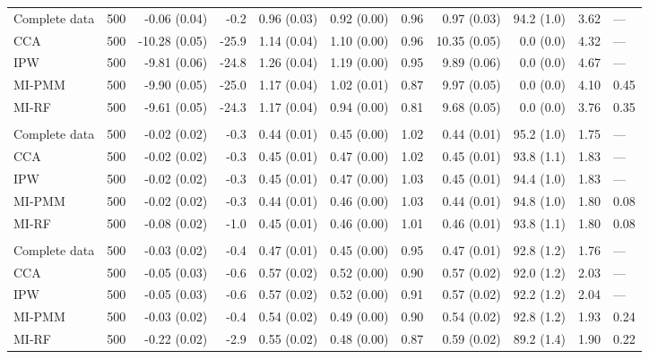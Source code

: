 \begin{longtable}{l|rrrrrrrrrl}
\midrule\addlinespace[2.5pt]
\multicolumn{11}{l}{Stunting — MNAR 50\%} \\[2.5pt] 
\midrule\addlinespace[2.5pt]
Complete data & 500 & -0.06 (0.04) & -0.2 & 0.96 (0.03) & 0.92 (0.00) & 0.96 & 0.97 (0.03) & 94.2 (1.0) & 3.62 & — \\ 
CCA & 500 & -10.28 (0.05) & -25.9 & 1.14 (0.04) & 1.10 (0.00) & 0.96 & 10.35 (0.05) & 0.0 (0.0) & 4.32 & — \\ 
IPW & 500 & -9.81 (0.06) & -24.8 & 1.26 (0.04) & 1.19 (0.00) & 0.95 & 9.89 (0.06) & 0.0 (0.0) & 4.67 & — \\ 
MI-PMM & 500 & -9.90 (0.05) & -25.0 & 1.17 (0.04) & 1.02 (0.01) & 0.87 & 9.97 (0.05) & 0.0 (0.0) & 4.10 & 0.45 \\ 
MI-RF & 500 & -9.61 (0.05) & -24.3 & 1.17 (0.04) & 0.94 (0.00) & 0.81 & 9.68 (0.05) & 0.0 (0.0) & 3.76 & 0.35 \\ 
\midrule\addlinespace[2.5pt]
\multicolumn{11}{l}{Wasting — MCAR 10\%} \\[2.5pt] 
\midrule\addlinespace[2.5pt]
Complete data & 500 & -0.02 (0.02) & -0.3 & 0.44 (0.01) & 0.45 (0.00) & 1.02 & 0.44 (0.01) & 95.2 (1.0) & 1.75 & — \\ 
CCA & 500 & -0.02 (0.02) & -0.3 & 0.45 (0.01) & 0.47 (0.00) & 1.02 & 0.45 (0.01) & 93.8 (1.1) & 1.83 & — \\ 
IPW & 500 & -0.02 (0.02) & -0.3 & 0.45 (0.01) & 0.47 (0.00) & 1.03 & 0.45 (0.01) & 94.4 (1.0) & 1.83 & — \\ 
MI-PMM & 500 & -0.02 (0.02) & -0.3 & 0.44 (0.01) & 0.46 (0.00) & 1.03 & 0.44 (0.01) & 94.8 (1.0) & 1.80 & 0.08 \\ 
MI-RF & 500 & -0.08 (0.02) & -1.0 & 0.45 (0.01) & 0.46 (0.00) & 1.01 & 0.46 (0.01) & 93.8 (1.1) & 1.80 & 0.08 \\ 
\midrule\addlinespace[2.5pt]
\multicolumn{11}{l}{Wasting — MCAR 30\%} \\[2.5pt] 
\midrule\addlinespace[2.5pt]
Complete data & 500 & -0.03 (0.02) & -0.4 & 0.47 (0.01) & 0.45 (0.00) & 0.95 & 0.47 (0.01) & 92.8 (1.2) & 1.76 & — \\ 
CCA & 500 & -0.05 (0.03) & -0.6 & 0.57 (0.02) & 0.52 (0.00) & 0.90 & 0.57 (0.02) & 92.0 (1.2) & 2.03 & — \\ 
IPW & 500 & -0.05 (0.03) & -0.6 & 0.57 (0.02) & 0.52 (0.00) & 0.91 & 0.57 (0.02) & 92.2 (1.2) & 2.04 & — \\ 
MI-PMM & 500 & -0.03 (0.02) & -0.4 & 0.54 (0.02) & 0.49 (0.00) & 0.90 & 0.54 (0.02) & 92.8 (1.2) & 1.93 & 0.24 \\ 
MI-RF & 500 & -0.22 (0.02) & -2.9 & 0.55 (0.02) & 0.48 (0.00) & 0.87 & 0.59 (0.02) & 89.2 (1.4) & 1.90 & 0.22 \\ 

\end{longtable}
